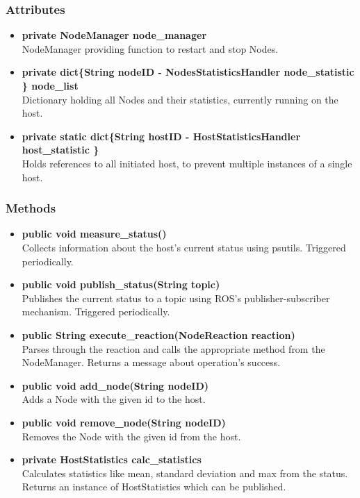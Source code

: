 \subsubsection{Attributes}
\begin{itemize}
	\item \textbf{private NodeManager node\_manager}\\
			NodeManager providing function to restart and stop Nodes.
	\item \textbf{private  dict\{String nodeID  - NodesStatisticsHandler node\_statistic  \} node\_list}\\
			Dictionary holding all Nodes and their statistics, currently running on the host.
	\item \textbf{private static dict\{String hostID   - HostStatisticsHandler host\_statistic \}}\\
			Holds references to all initiated host, to prevent multiple instances of a single host.
\end{itemize}

\subsubsection{Methods}
\begin{itemize}
	\item \textbf{public void measure\_status()}\\
			Collects information about the host's current status using psutils.
			Triggered periodically.
	\item \textbf{public void publish\_status(String topic)}\\
			Publishes the current status to a topic using ROS's publisher-subscriber mechanism.
			Triggered periodically.
	\item \textbf{public String execute\_reaction(NodeReaction reaction)}\\
			Parses through the reaction and calls the appropriate method from the NodeManager.
			Returns a message about operation's success.
	\item \textbf{public void add\_node(String nodeID)}\\
			Adds a Node with the given id to the host.
	\item \textbf{public void remove\_node(String nodeID)}\\
			Removes the Node with the given id from the host.
	\item \textbf{private HostStatistics calc\_statistics}\\
			Calculates statistics like mean, standard deviation and max from the status.
			Returns an instance of HostStatistics which can be published.
\end{itemize}

